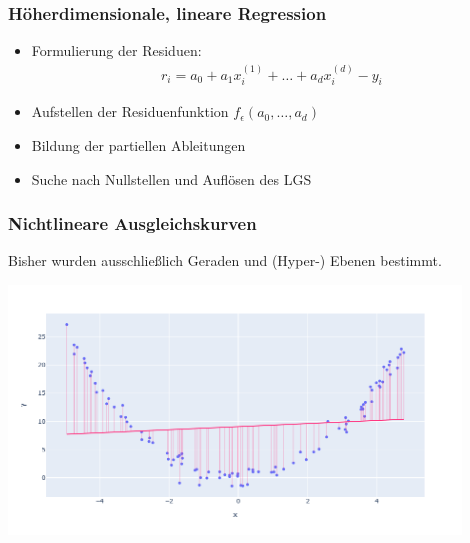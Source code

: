 
\begin{frame}
\frametitle{Höherdimensionale, lineare Regression}

\begin{itemize}
	\item Formulierung der Residuen: \begin{align*}
		r_i = a_0 + a_1 x^{(1)}_i + \dots + a_d x^{(d)}_i - y_i
	\end{align*}
	\item Aufstellen der Residuenfunktion $f_\epsilon(a_0, \dots, a_d)$
	\item Bildung der partiellen Ableitungen
	\item Suche nach Nullstellen und Auflösen des LGS
\end{itemize}

\end{frame}


\begin{frame}
\frametitle{Nichtlineare Ausgleichskurven}

Bisher wurden ausschließlich Geraden und (Hyper-) Ebenen bestimmt.

\begin{center}
	\includegraphics[width=0.9\textwidth]{fig7/squared.png}
\end{center}

\end{frame}


